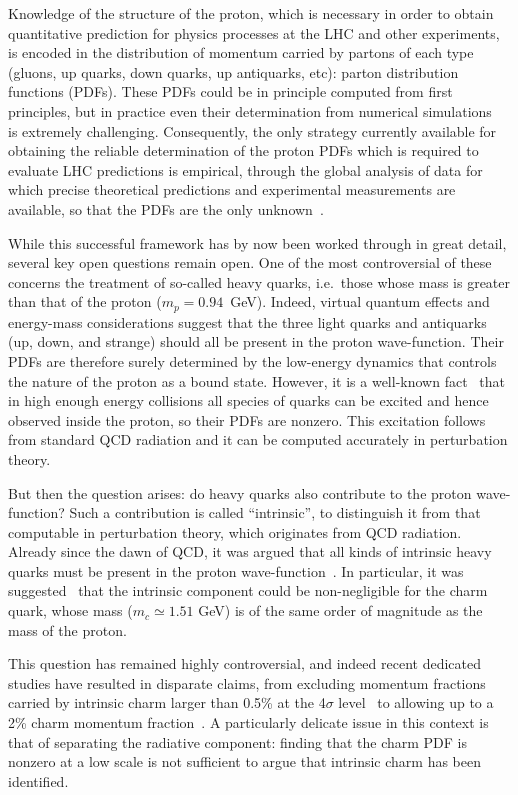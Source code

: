 \documentclass[11pt,a4paper]{article}
\begin{document}
Knowledge of the structure of the proton, which is necessary in order
to obtain
quantitative prediction for physics processes at the LHC and other
experiments, is encoded in
the distribution of  momentum carried by partons of each type
(gluons, up quarks, down quarks, up antiquarks, etc):
parton distribution functions (PDFs).
%
These PDFs could be in principle
computed from first principles, but in
practice even their determination from numerical
simulations~\cite{Constantinou:2020hdm} is extremely challenging.
%
Consequently,  the only 
strategy currently available for obtaining the
reliable determination of the proton PDFs which is required to evaluate LHC
predictions is empirical, through the global analysis of
data for which precise theoretical predictions and experimental
measurements are available, so that the PDFs are the only
unknown~\cite{Gao:2017yyd}.

While this successful framework has by now been worked through in great detail, several key open questions remain open.
%
One of the most controversial of these concerns the treatment of
so-called heavy quarks, i.e.\ those whose mass is greater than that of
the proton ($m_p=0.94$~GeV). Indeed, virtual quantum effects and
energy-mass considerations suggest that the three light quarks and
antiquarks (up, 
down, and strange) should all be present in the proton
wave-function.
%
Their PDFs are therefore surely determined by the low-energy
dynamics that controls the nature of the proton as a bound
state.
%
However, it is a well-known fact~\cite{DeRoeck:2011na,
  Kovarik:2019xvh,Gao:2017yyd,Rojo:2019uip}
that in high enough energy collisions all species of quarks can be
excited and hence observed
inside the proton, so their PDFs are nonzero.
%
This excitation
follows from standard QCD radiation and it can be computed accurately
in perturbation theory.

But then the question arises: do heavy quarks also contribute to the
proton wave-function? Such a contribution is called ``intrinsic'', to
distinguish it from that computable in
perturbation theory, which originates from QCD radiation.
%
Already since the dawn of QCD, it
was argued that all kinds of intrinsic heavy quarks must be
present in the
proton wave-function~\cite{Brodsky:1984nx}.
%
In particular, it was
suggested~\cite{Brodsky:1980pb}
that the intrinsic component could be non-negligible for the
charm quark, whose mass ($m_c\simeq 1.51$ GeV) is of the same order of
magnitude as the mass of the proton.

This question has remained highly controversial, and indeed recent
dedicated studies have resulted in disparate claims,
from excluding momentum fractions carried by intrinsic  charm larger than 0.5\% at the 4$\sigma$
level~\cite{Jimenez-Delgado:2014zga} to allowing up to a 2\% charm momentum
fraction~\cite{Hou:2017khm}.
%
A particularly delicate issue in this context is that of
separating the radiative component: finding that the charm PDF
is nonzero at a low scale is not sufficient to argue that intrinsic charm
has been identified.
\end{document}
